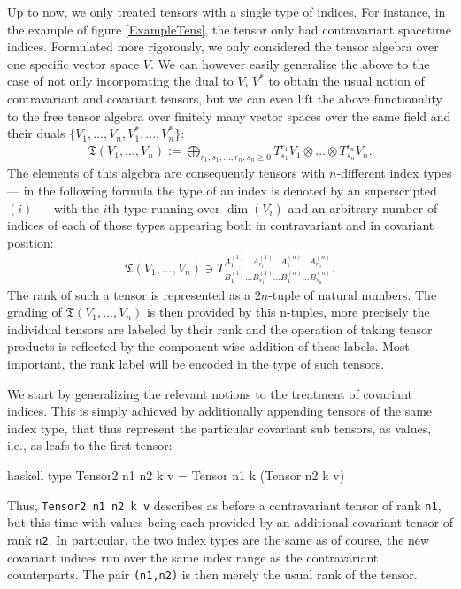 Up to now, we only treated tensors with a single type of indices. For instance, in the example of figure \ref{ExampleTens}, the tensor only had contravariant spacetime indices.
Formulated more rigorously, we only considered the tensor algebra over one specific vector space $V$.
We can however easily generalize the above to the case of not only incorporating the dual to $V$, $V^{\ast}$ to obtain the usual notion of contravariant and covariant tensors, but we can even lift the above functionality to the free tensor algebra over finitely many vector spaces over the same field and their duals $\{V_1,...,V_n,V_1^{\ast},...,V_n^{\ast}\}$:
\begin{align}
    \mathfrak{T}(V_1,...,V_n) := \bigoplus_{r_1,s_1,...,r_n,s_n \geq 0}T^{r_1}_{s_1}V_1 \otimes ... \otimes T^{r_n}_{s_n}V_n.
\end{align}
The elements of this algebra are consequently tensors with $n$-different index types --- in the following formula the type of an index is denoted by an superscripted $(i)$ --- with the $i$th type running over $\operatorname{dim}(V_i)$ and an arbitrary number of indices of each of those types appearing both in contravariant and in covariant position:
\begin{align}
    \mathfrak{T}(V_1,...,V_n) \ni T^{A^{(1)}_1 ... A^{(1)}_{r_1} ... A^{(n)}_1 ... A^{(n)}_{r_n}}
    _{B^{(1)}_1 ... B^{(1)}_{s_1} ... B^{(n)}_1 ... B^{(n)}_{s_n}}.
\end{align}
The rank of such a tensor is represented as a $2n$-tuple of natural numbers. The grading of $\mathfrak{T}(V_1,...,V_n)$ is then provided by this n-tuples, more precisely the individual tensors are labeled by their rank and the operation of taking tensor products is reflected by the component wise addition of these labels. Most important, the rank label will be encoded in the type of such tensors.

We start by generalizing the relevant notions to the treatment of covariant indices.
This is simply achieved by additionally appending tensors of the same index type, that thus represent the particular covariant sub tensors, as values, i.e., as leafs
to the first tensor:
\begin{center}
\begin{cminted}{haskell}
type Tensor2 n1 n2 k v = Tensor n1 k (Tensor n2 k v)
\end{cminted}
\end{center}
Thus, \texttt{Tensor2 n1 n2 k v} describes as before a contravariant tensor of rank \texttt{n1}, but this time with values being each provided by an additional covariant tensor of rank \texttt{n2}. In particular, the two index types are the same as of course, the new covariant indices run over the same index range as the contravariant counterparts. The pair \texttt{(n1,n2)} is then merely the usual rank of the tensor.

